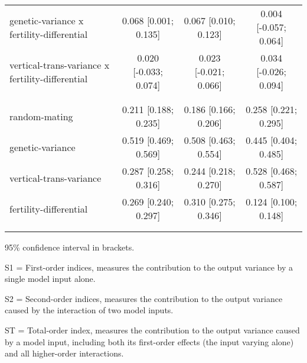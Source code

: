 \begin{table}[htp]
\begin{threeparttable}
\begin{tabular}{lccc}
	  \hspace{1.5em} genetic-variance x fertility-differential & 0.068 [0.001; 0.135]   & 0.067 [0.010; 0.123]   & 0.004 [-0.057; 0.064] \\
	  \hspace{1.5em} vertical-trans-variance x fertility-differential & 0.020 [-0.033; 0.074]   & 0.023 [-0.021; 0.066]   & 0.034 [-0.026; 0.094] \\
	 \\
    \addlinespace[12pt]
    \multicolumn{4}{l}{\hspace{1em} ST} \\ 
\hspace{1.5em} random-mating & 0.211 [0.188; 0.235]   & 0.186 [0.166; 0.206]   & 0.258 [0.221; 0.295] \\
	  \hspace{1.5em} genetic-variance & 0.519 [0.469; 0.569]   & 0.508 [0.463; 0.554]   & 0.445 [0.404; 0.485] \\
	  \hspace{1.5em} vertical-trans-variance & 0.287 [0.258; 0.316]   & 0.244 [0.218; 0.270]   & 0.528 [0.468; 0.587] \\
	  \hspace{1.5em} fertility-differential & 0.269 [0.240; 0.297]   & 0.310 [0.275; 0.346]   & 0.124 [0.100; 0.148] \\
	 \\
    \addlinespace
    \hline
    \end{tabular}
    \begin{tablenotes}
    \scriptsize
    \item 95\% confidence interval in brackets.
    \item S1 = First-order indices,  measures the contribution to the output variance by a single model input alone.
    \item S2 = Second-order indices,  measures the contribution to the output variance caused by the interaction of two model inputs.
    \item ST = Total-order index, measures the contribution to the output variance caused by a model input, including both its first-order effects (the input varying alone) and all higher-order interactions.
    \end{tablenotes}
    \end{threeparttable}
    \end{table}